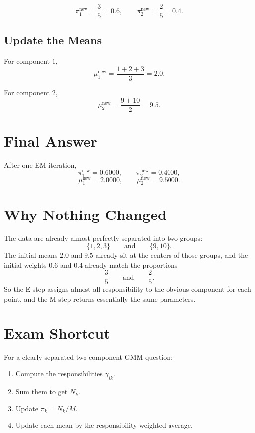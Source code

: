 \documentclass[11pt]{article}
\begin{document}
\[
    \pi_1^{\text{new}}=\frac{3}{5}=0.6,
    \qquad
    \pi_2^{\text{new}}=\frac{2}{5}=0.4.
\]

\subsection*{Update the Means}

For component \(1\),
\[
    \mu_1^{\text{new}}
    =
    \frac{1+2+3}{3}
    =
    2.0.
\]

For component \(2\),
\[
    \mu_2^{\text{new}}
    =
    \frac{9+10}{2}
    =
    9.5.
\]

\section*{Final Answer}

After one EM iteration,
\[
    \boxed{\pi_1^{\text{new}}=0.6000,\qquad \pi_2^{\text{new}}=0.4000,}
\]
\[
    \boxed{\mu_1^{\text{new}}=2.0000,\qquad \mu_2^{\text{new}}=9.5000.}
\]

\section*{Why Nothing Changed}

The data are already almost perfectly separated into two groups:
\[
    \{1,2,3\}
    \qquad \text{and} \qquad
    \{9,10\}.
\]
The initial means \(2.0\) and \(9.5\) already sit at the centers of those groups,
and the initial weights \(0.6\) and \(0.4\) already match the proportions
\[
    \frac{3}{5}
    \qquad \text{and} \qquad
    \frac{2}{5}.
\]
So the E-step assigns almost all responsibility to the obvious component for each
point, and the M-step returns essentially the same parameters.

\section*{Exam Shortcut}

For a clearly separated two-component GMM question:
\begin{enumerate}[label=\arabic*.]
    \item Compute the responsibilities \(\gamma_{ik}\).
    \item Sum them to get \(N_k\).
    \item Update \(\pi_k=N_k/M\).
    \item Update each mean by the responsibility-weighted average.
\end{enumerate}
\end{document}
